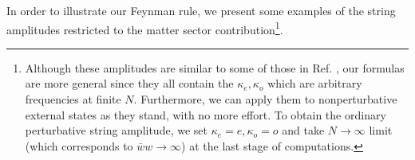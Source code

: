 \documentclass[a4paper,11pt]{article}
\begin{document}

In order to illustrate our Feynman rule, we present some examples
of the string amplitudes restricted to the matter sector
contribution\footnote{ Although these amplitudes are similar to
some of those in Ref. \cite{Taylor}, our formulas are more general
since they all contain the $ \kappa _{e},\kappa _{o}$ which are
arbitrary frequencies at finite $N$. Furthermore, we can apply
them to nonperturbative external states as they stand, with no
more effort. To obtain the ordinary perturbative string amplitude,
we set $\kappa _{e}=e,\kappa _{o}=o$ and take $N\rightarrow \infty
$ limit (which corresponds to $\bar{w}w\rightarrow \infty $) at
the last stage of computations. }.
\end{document}

